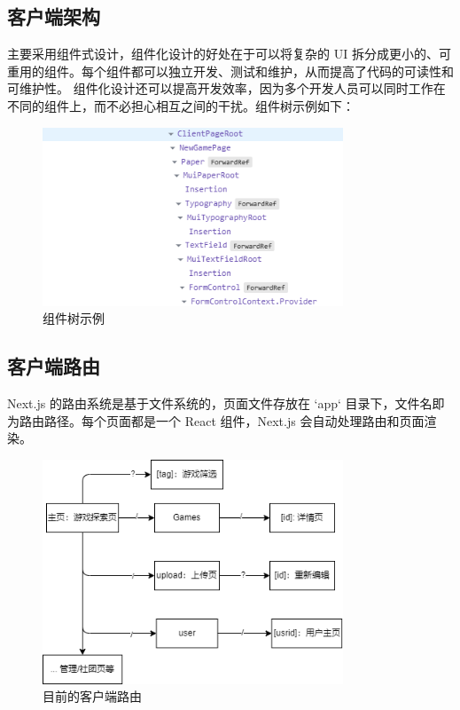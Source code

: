 \documentclass[12pt]{ctexart} %
\begin{document}
\subsection{客户端架构}

主要采用组件式设计，组件化设计的好处在于可以将复杂的 UI 拆分成更小的、可重用的组件。每个组件都可以独立开发、测试和维护，从而提高了代码的可读性和可维护性。
组件化设计还可以提高开发效率，因为多个开发人员可以同时工作在不同的组件上，而不必担心相互之间的干扰。组件树示例如下：

\begin{figure}[H]
  \centering
  \includegraphics[width=0.8\textwidth]{Client-tree.png}
  \caption{组件树示例}
\end{figure}

\subsection{客户端路由}

Next.js 的路由系统是基于文件系统的，页面文件存放在 `app` 目录下，文件名即为路由路径。每个页面都是一个 React 组件，Next.js 会自动处理路由和页面渲染。

\begin{figure}[H]
  \centering
  \includegraphics[width=0.8\textwidth]{Client-arch.png}
  \caption{目前的客户端路由}
\end{figure}
\end{document}

